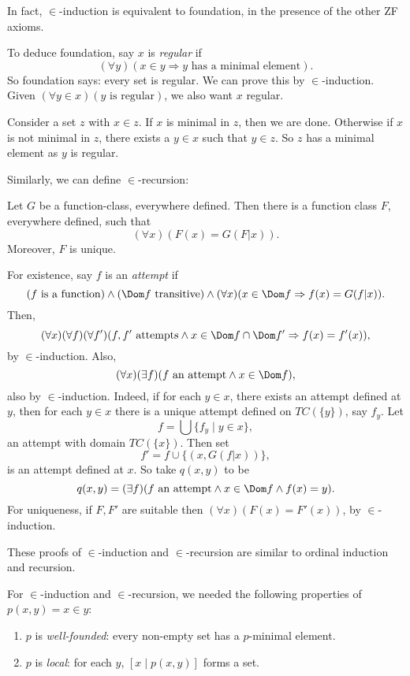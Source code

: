 \documentclass[12pt]{article}
\begin{document}
In fact, $\in$-induction is equivalent to foundation, in the presence of the other ZF axioms.

To deduce foundation, say $x$ is \emph{regular} if
\[
	(\forall y)(x \in y \Rightarrow y \text{ has a minimal element}).
\]
So foundation says: every set is regular. We can prove this by $\in$-induction. Given $(\forall y \in x)(y \text{ is regular})$, we also want $x$ regular.

Consider a set $z$ with $x \in z$. If $x$ is minimal in $z$, then we are done. Otherwise if $x$ is not minimal in $z$, there exists a $y \in x$ such that $y \in z$. So $z$ has a minimal element as $y$ is regular.

Similarly, we can define $\in$-recursion:

\begin{theorem}Let $G$ be a function-class, everywhere defined. Then there is a function class $F$, everywhere defined, such that
	\[
		(\forall x)(F(x) = G(F|x)).
	\]
	Moreover, $F$ is unique.
\end{theorem}

\begin{proofbox}
	For existence, say $f$ is an \emph{attempt} if
	\[
		(f \text{ is a function}) \wedge (\Dom f \text{ transitive}) \wedge (\forall x)(x \in \Dom f \Rightarrow f(x) = G(f|x)).
	\]
	Then,
	\[
		(\forall x)(\forall f)(\forall f')(f, f' \text{ attempts} \wedge x \in \Dom f \cap \Dom f' \Rightarrow f(x) = f'(x)),
	\]
	by $\in$-induction. Also,
	\[
		(\forall x)(\exists f)(f \text{ an attempt} \wedge x \in \Dom f),
	\]
	also by $\in$-induction. Indeed, if for each $y \in x$, there exists an attempt defined at $y$, then for each $y \in x$ there is a unique attempt defined on $TC(\{y\})$, say $f_y$. Let
	\[
		f = \bigcup \{f_y \mid y \in x\},
	\]
	an attempt with domain $TC(\{x\})$. Then set
	\[
		f' = f \cup \{(x, G(f|x))\},
	\]
	is an attempt defined at $x$. So take $q(x, y)$ to be
	\[
		q(x, y) = (\exists f)(f \text{ an attempt} \wedge x \in \Dom f \wedge f(x) = y).
	\]
	For uniqueness, if $F, F'$ are suitable then $(\forall x)(F(x) = F'(x))$, by $\in$-induction.
\end{proofbox}

\begin{remark}
	These proofs of $\in$-induction and $\in$-recursion are similar to ordinal induction and recursion.
\end{remark}

For $\in$-induction and $\in$-recursion, we needed the following properties of $p(x, y) = x \in y$:
\begin{enumerate}
	\item $p$ is \emph{well-founded}: every non-empty set has a $p$-minimal element.
	\item $p$ is \emph{local}: for each $y$, $[x \mid p(x, y)]$ forms a set.
\end{enumerate}
\end{document}
